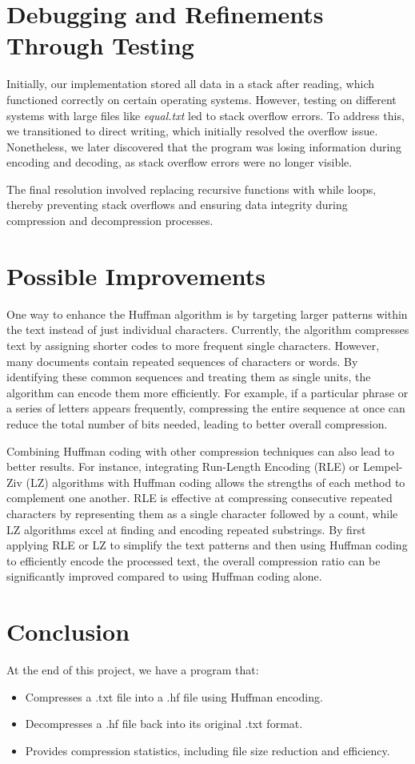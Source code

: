 \documentclass[12pt,oneside,letterpaper,english]{article}
\begin{document}
\section{Debugging and Refinements Through Testing}
Initially, our implementation stored all data in a stack after reading, which functioned correctly on certain operating systems. However, testing on different systems with large files like \textit{equal.txt} led to stack overflow errors. To address this, we transitioned to direct writing, which initially resolved the overflow issue. Nonetheless, we later discovered that the program was losing information during encoding and decoding, as stack overflow errors were no longer visible.

The final resolution involved replacing recursive functions with while loops, thereby preventing stack overflows and ensuring data integrity during compression and decompression processes.

\section{Possible Improvements}
One way to enhance the Huffman algorithm is by targeting larger patterns within the text instead of just individual characters. Currently, the algorithm compresses text by assigning shorter codes to more frequent single characters. However, many documents contain repeated sequences of characters or words. By identifying these common sequences and treating them as single units, the algorithm can encode them more efficiently. For example, if a particular phrase or a series of letters appears frequently, compressing the entire sequence at once can reduce the total number of bits needed, leading to better overall compression.

Combining Huffman coding with other compression techniques can also lead to better results. For instance, integrating Run-Length Encoding (RLE) or Lempel-Ziv (LZ) algorithms with Huffman coding allows the strengths of each method to complement one another. RLE is effective at compressing consecutive repeated characters by representing them as a single character followed by a count, while LZ algorithms excel at finding and encoding repeated substrings. By first applying RLE or LZ to simplify the text patterns and then using Huffman coding to efficiently encode the processed text, the overall compression ratio can be significantly improved compared to using Huffman coding alone.

\section{Conclusion}
At the end of this project, we have a program that:
\begin{itemize}
    \item 
        Compresses a .txt file into a .hf file using Huffman encoding.
    \item
        Decompresses a .hf file back into its original .txt format.
    \item
        Provides compression statistics, including file size reduction and efficiency.
\end{itemize}
\end{document}
